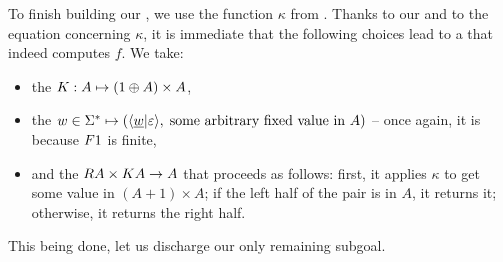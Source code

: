 To finish building our , we use the
function $\kappa$ from . Thanks to our
 and to the equation concerning $\kappa$, it is immediate that the
following choices lead to a \functorialsst that indeed computes $f$. We take:
\begin{itemize}
\item the  $\functork : A \mapsto (1 \oplus A)\times A$,
\item the  $w\in\Sigma^* \mapsto
  (\langle \underline{w}|\varepsilon \rangle,\;\text{some arbitrary fixed value in
    $A$})$ -- once again, it is  because $\functor1$ is finite,
\item and the  $\functorr A \times \functork A \to A$ that
  proceeds as follows: first, it applies $\kappa$ to get some value in
  $(A+1)\times A$; if the left half of the pair is in $A$, it returns it;
  otherwise, it returns the right half.
\end{itemize}
This being done, let us discharge our only remaining subgoal.

